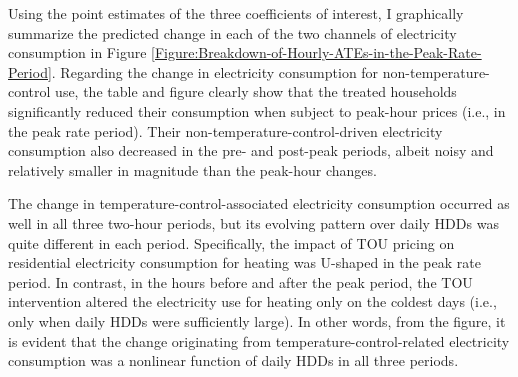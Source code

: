 Using the point estimates of the three coefficients of interest, I graphically summarize the predicted change in each of the two channels of electricity consumption in Figure \ref{Figure:Breakdown-of-Hourly-ATEs-in-the-Peak-Rate-Period}. Regarding the change in electricity consumption for non-temperature-control use, the table and figure clearly show that the treated households significantly reduced their consumption when subject to peak-hour prices (i.e., in the peak rate period). Their non-temperature-control-driven electricity consumption also decreased in the pre- and post-peak periods, albeit noisy and relatively smaller in magnitude than the peak-hour changes. 

The change in temperature-control-associated electricity consumption occurred as well in all three two-hour periods, but its evolving pattern over daily HDDs was quite different in each period. Specifically, the impact of TOU pricing on residential electricity consumption for heating was U-shaped in the peak rate period. In contrast, in the hours before and after the peak period, the TOU intervention altered the electricity use for heating only on the coldest days (i.e., only when daily HDDs were sufficiently large). In other words, from the figure, it is evident that the change originating from temperature-control-related electricity consumption was a nonlinear function of daily HDDs in all three periods.

